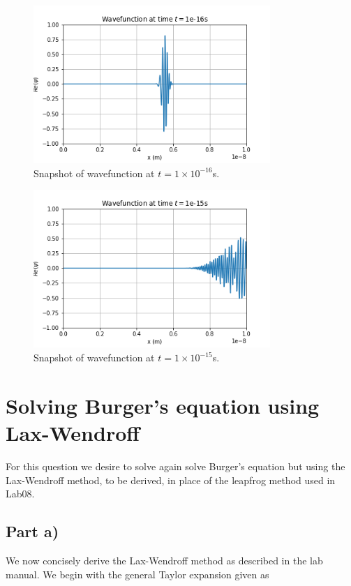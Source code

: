 \documentclass{article}
\begin{document}
\begin{figure}[H]
	\centering
	\includegraphics[width=0.8\textwidth]{../images/q2_t=1e-16.png}
	\caption{Snapshot of wavefunction at $t=1\times 10^{-16}$s.}
	\label{fig:q2_t=1e-16}
\end{figure}

\begin{figure}[H]
	\centering
	\includegraphics[width=0.8\textwidth]{../images/q2_t=1e-15.png}
	\caption{Snapshot of wavefunction at $t=1\times 10^{-15}$s.}
	\label{fig:q2_t=1e-15}
\end{figure}

\section{Solving Burger's equation using Lax-Wendroff}
For this question we desire to solve again solve Burger's equation but using the Lax-Wendroff method, to be derived, in place of the leapfrog method used in Lab08.

\subsection{Part a)}
We now concisely derive the Lax-Wendroff method as described in the lab manual. We begin with the general Taylor expansion given as 
\end{document}
